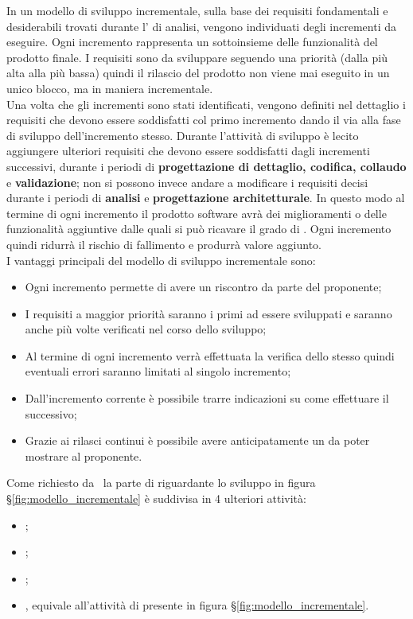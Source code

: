 In un modello di sviluppo incrementale, sulla base dei requisiti fondamentali e desiderabili trovati durante l' di analisi, vengono individuati degli incrementi da eseguire. Ogni incremento rappresenta un sottoinsieme delle funzionalità del prodotto finale. I requisiti sono da sviluppare seguendo una priorità (dalla più alta alla più bassa) quindi il rilascio del prodotto non viene mai eseguito in un unico blocco, ma in maniera incrementale.\\
Una volta che gli incrementi sono stati identificati, vengono definiti nel dettaglio i requisiti che devono essere soddisfatti col primo incremento dando il via alla fase di sviluppo dell'incremento stesso. Durante l’attività di sviluppo è lecito aggiungere ulteriori requisiti che devono essere soddisfatti dagli incrementi successivi, durante i periodi di \textbf{progettazione di dettaglio, codifica, collaudo} e \textbf{validazione}; non si possono invece andare a modificare i requisiti decisi durante i periodi di \textbf{analisi} e \textbf{progettazione architetturale}. In questo modo al termine di ogni incremento il prodotto software avrà dei miglioramenti o delle funzionalità aggiuntive dalle quali si può ricavare il grado di . Ogni incremento quindi ridurrà il rischio di fallimento e produrrà valore aggiunto.\\
I vantaggi principali del modello di sviluppo incrementale sono:
\begin{itemize}
    \item Ogni incremento permette di avere un riscontro da parte del proponente;
    \item I requisiti a maggior priorità saranno i primi ad essere sviluppati e saranno anche più volte verificati nel corso dello sviluppo;
    \item Al termine di ogni incremento verrà effettuata la verifica dello stesso quindi eventuali errori saranno limitati al singolo incremento;
    \item Dall'incremento corrente è possibile trarre indicazioni su come effettuare il successivo;
    \item Grazie ai rilasci continui è possibile avere anticipatamente un  da poter mostrare al proponente.
\end{itemize}

Come richiesto da \Proponente\ la parte di  riguardante lo sviluppo in figura \S\ref{fig:modello_incrementale} è suddivisa in 4 ulteriori attività:
\begin{itemize}
    \item {};
    \item {};
    \item {};
    \item {}, equivale all'attività di  presente in figura \S\ref{fig:modello_incrementale}.
\end{itemize}